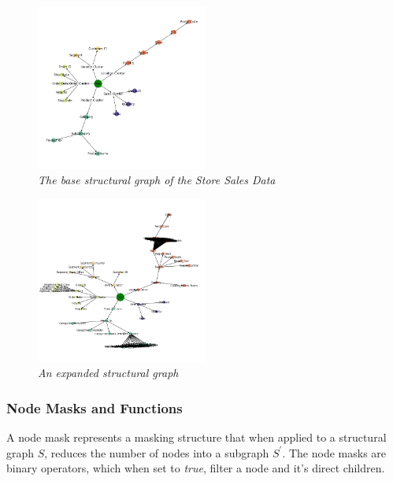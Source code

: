 \begin{figure}[H]
	\centering
        \includegraphics[width=0.5\textwidth]{images/base_hierarchy.png}
	\caption{\textit{The base structural graph of the Store Sales Data}}
	\label{fig:fig1}
\end{figure}


\begin{figure}[H]
	\centering
        \includegraphics[width=0.5\textwidth]{images/expanded_node_structure.png}
	\caption{\textit{An expanded structural graph}}
	\label{fig:fig1}
\end{figure}

\subsubsection{Node Masks and Functions}
\label{sec:Filters}
A node mask represents a masking structure that when applied to a structural graph $S$, reduces the number of nodes into a subgraph $S^{'}$. The node masks are binary operators, which when set to \textit{true}, filter a node and it's direct children.


